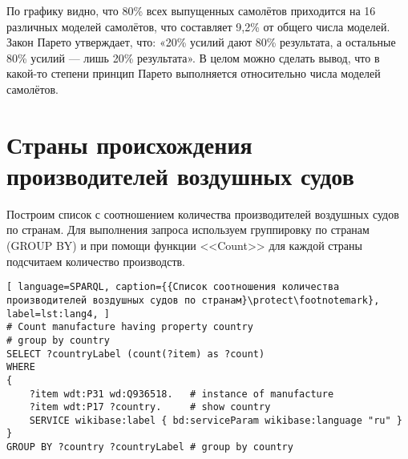По графику видно, что 80\% всех выпущенных самолётов приходится на 16 различных моделей самолётов, что составляет 9,2\% от общего числа моделей. Закон Парето утверждает, что: «20\% усилий дают 80\% результата, а остальные 80\% усилий — лишь 20\% результата». В целом можно сделать вывод, что в какой-то степени принцип Парето выполняется относительно числа моделей самолётов.


\section{Страны происхождения производителей воздушных судов}

Построим список с соотношением количества производителей воздушных судов по странам. Для выполнения запроса используем группировку по странам (GROUP BY) и при помощи функции <<Count>> для каждой страны подсчитаем количество производств.

\label{aircraft_question_3}

\begin{lstlisting}[ language=SPARQL, caption={{Список соотношения количества производителей воздушных судов по странам}\protect\footnotemark}, label=lst:lang4, ]
# Count manufacture having property country
# group by country
SELECT ?countryLabel (count(?item) as ?count)
WHERE
{
    ?item wdt:P31 wd:Q936518.   # instance of manufacture
    ?item wdt:P17 ?country.     # show country
    SERVICE wikibase:label { bd:serviceParam wikibase:language "ru" }
}
GROUP BY ?country ?countryLabel # group by country
\end{lstlisting}

